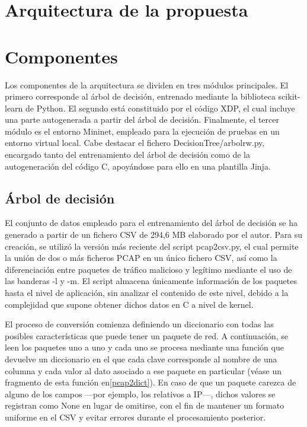 \section{Arquitectura de la propuesta}

\section{Componentes}
Los componentes de la arquitectura se dividen en tres módulos principales. El primero corresponde al árbol de decisión, entrenado mediante la biblioteca scikit-learn de Python. El segundo está constituido por el código XDP, el cual incluye una parte autogenerada a partir del árbol de decisión. Finalmente, el tercer módulo es el entorno Mininet, empleado para la ejecución de pruebas en un entorno virtual local. Cabe destacar el fichero DecisionTree/arbolrw.py, encargado tanto del entrenamiento del árbol de decisión como de la autogeneración del código C, apoyándose para ello en una plantilla Jinja.

\subsection{Árbol de decisión}
El conjunto de datos empleado para el entrenamiento del árbol de decisión se ha generado a partir de un fichero CSV de 294,6 MB elaborado por el autor. Para su creación, se utilizó la versión más reciente del script pcap2csv.py, el cual permite la unión de dos o más ficheros PCAP en un único fichero CSV, así como la diferenciación entre paquetes de tráfico malicioso y legítimo mediante el uso de las banderas -l y -m. El script almacena únicamente información de los paquetes hasta el nivel de aplicación, sin analizar el contenido de este nivel, debido a la complejidad que supone obtener dichos datos en C a nivel de kernel.

El proceso de conversión comienza definiendo un diccionario con todas las posibles características que puede tener un paquete de red. A continuación, se leen los paquetes uno a uno y cada uno se procesa mediante una función que devuelve un diccionario en el que cada clave corresponde al nombre de una columna y cada valor al dato asociado a ese paquete en particular (véase un fragmento de esta función en\ref{pcap2dict}). En caso de que un paquete carezca de alguno de los campos —por ejemplo, los relativos a IP—, dichos valores se registran como None en lugar de omitirse, con el fin de mantener un formato uniforme en el CSV y evitar errores durante el procesamiento posterior.

